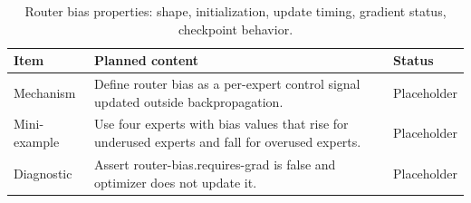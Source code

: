 \begin{table}[H]
\centering
\caption{Router bias properties: shape, initialization, update timing, gradient status, checkpoint behavior.}
\label{tab:ch09-router-bias-as-non-trainable-state}
\begin{tabularx}{\textwidth}{p{}X p{}}
\toprule
Item & Planned content & Status \\
\midrule
Mechanism & Define router bias as a per-expert control signal updated outside backpropagation. & Placeholder \\
Mini-example & Use four experts with bias values that rise for underused experts and fall for overused experts. & Placeholder \\
Diagnostic & Assert router-bias.requires-grad is false and optimizer does not update it. & Placeholder \\
\bottomrule
\end{tabularx}
\end{table}
